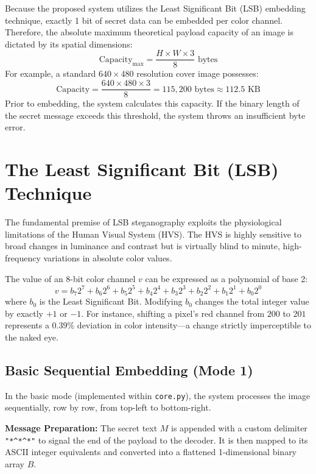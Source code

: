 \documentclass[12pt,a4paper]{report}
\begin{document}
Because the proposed system utilizes the Least Significant Bit (LSB) embedding technique, exactly 1 bit of secret data can be embedded per color channel. Therefore, the absolute maximum theoretical payload capacity of an image is dictated by its spatial dimensions:
\begin{equation}
    \text{Capacity}_{\text{max}} = \frac{H \times W \times 3}{8} \text{ bytes}
\end{equation}
For example, a standard $640 \times 480$ resolution cover image possesses:
$$ \text{Capacity} = \frac{640 \times 480 \times 3}{8} = 115,200 \text{ bytes} \approx 112.5 \text{ KB} $$
Prior to embedding, the system calculates this capacity. If the binary length of the secret message exceeds this threshold, the system throws an insufficient byte error.

\section{The Least Significant Bit (LSB) Technique}
The fundamental premise of LSB steganography exploits the physiological limitations of the Human Visual System (HVS). The HVS is highly sensitive to broad changes in luminance and contrast but is virtually blind to minute, high-frequency variations in absolute color values.

The value of an 8-bit color channel $v$ can be expressed as a polynomial of base 2:
$$ v = b_7 2^7 + b_6 2^6 + b_5 2^5 + b_4 2^4 + b_3 2^3 + b_2 2^2 + b_1 2^1 + b_0 2^0 $$
where $b_0$ is the Least Significant Bit. Modifying $b_0$ changes the total integer value by exactly $+1$ or $-1$. For instance, shifting a pixel's red channel from $200$ to $201$ represents a $0.39\%$ deviation in color intensity—a change strictly imperceptible to the naked eye.

\subsection{Basic Sequential Embedding (Mode 1)}
In the basic mode (implemented within \texttt{core.py}), the system processes the image sequentially, row by row, from top-left to bottom-right. 

\textbf{Message Preparation:} The secret text $M$ is appended with a custom delimiter \texttt{"*\^{}*\^{}*"} to signal the end of the payload to the decoder. It is then mapped to its ASCII integer equivalents and converted into a flattened 1-dimensional binary array $B$.
\end{document}
